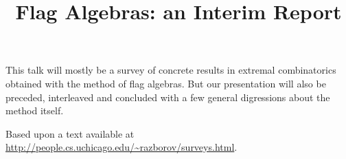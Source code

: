 \title{Flag Algebras: an Interim Report}
\endtitle

This talk will mostly be a survey of concrete results in extremal combinatorics obtained with the method of flag algebras. But our presentation will also be preceded, interleaved 
and concluded with a few general digressions about the method itself.

Based upon a text available at 
\url{http://people.cs.uchicago.edu/~razborov/surveys.html}. 